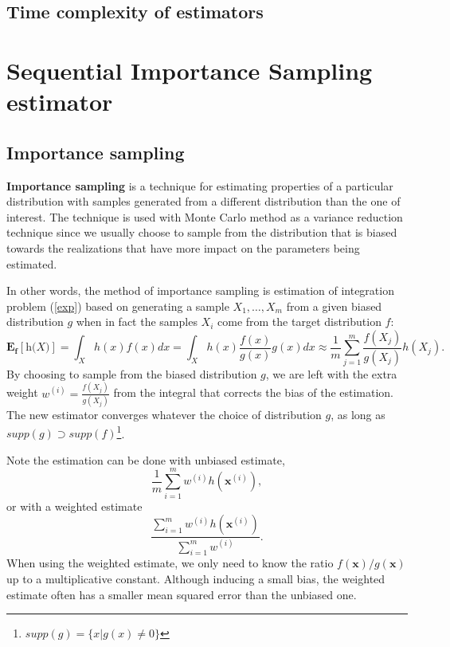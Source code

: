 \documentclass[times, utf8, diplomski]{fer}
\begin{document}
\section{Time complexity of estimators}

\chapter{Sequential Importance Sampling estimator}
\section{Importance sampling}

\textbf{Importance sampling} is a technique for estimating properties of a particular distribution with samples generated from a different distribution than the one of interest. The technique is used with Monte Carlo method as a variance reduction technique since we usually choose to sample from the distribution that is biased towards the realizations that have more impact on the parameters being estimated.

In other words, the method of importance sampling is estimation of integration problem (\ref{exp}) based on generating a sample $X_1, \ldots, X_m$ from a given biased distribution $\textit{g}$ when in fact the samples $X_i$ come from the target distribution $\textit{f}$:
\begin{equation}
\mathbf{E_f[\textit{h(X)}]} = \int_{X} h(x) f(x) dx = \int_{X} h(x) \frac{f(x)}{g(x)} g(x) dx \approx \frac{1}{m} \sum_{j = 1}^{m} \frac{f(X_j)}{g(X_j)} h(X_j).
\end{equation}
By choosing to sample from the biased distribution $g$, we are left with the extra weight $w^{(i)} = \frac{f(X_j)}{g(X_j)}$ from the integral that corrects the bias of the estimation. The new estimator converges whatever the choice of distribution $g$, as long as $supp(g) \supset supp(f)$\footnote{$supp(g) = \{x | g(x) \neq 0\}$}. %

Note the estimation can be done with unbiased estimate,
\begin{equation}
\frac{1}{m}\sum_{i=1}^{m}w^{(i)}h(\mathbf{x}^{(i)}),
\end{equation}
or with a weighted estimate
\begin{equation}
\frac{\sum_{i=1}^{m}w^{(i)}h(\mathbf{x}^{(i)})}{ \sum_{i=1}^{m}w^{(i)}}.
\label{wei_est}
\end{equation}
When using the weighted estimate, we only need to know the ratio $f(\mathbf{x})/g(\mathbf{x})$ up to a multiplicative constant. Although inducing a small bias, the weighted estimate often has a smaller mean squared error than the unbiased one.
\end{document}
